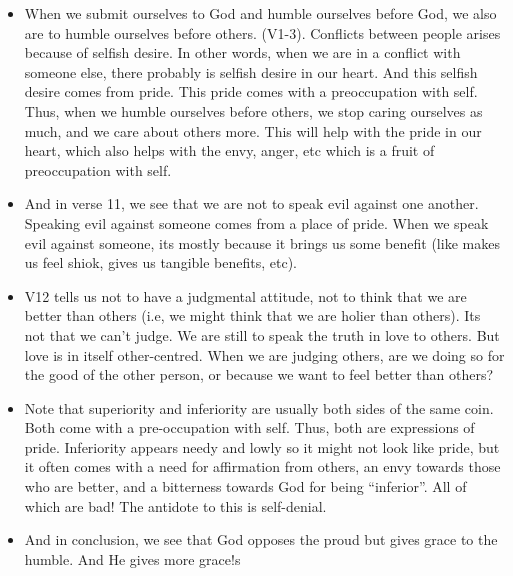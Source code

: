 \begin{itemize}
  \item When we submit ourselves to God and humble ourselves before God, we also are to humble ourselves before others. (V1-3). Conflicts between people arises because of selfish desire. In other words, when we are in a conflict with someone else, there probably is selfish desire in our heart. And this selfish desire comes from pride. This pride comes with a preoccupation with self. Thus, when we humble ourselves before others, we stop caring ourselves as much, and we care about others more. This will help with the pride in our heart, which also helps with the envy, anger, etc which is a fruit of preoccupation with self.
  \item And in verse 11, we see that we are not to speak evil against one another. Speaking evil against someone comes from a place of pride. When we speak evil against someone, its mostly because it brings us some benefit (like makes us feel shiok, gives us tangible benefits, etc). 
  \item V12 tells us not to have a judgmental attitude, not to think that we are better than others (i.e, we might think that we are holier than others). Its not that we can’t judge. We are still to speak the truth in love to others. But love is in itself other-centred. When we are judging others, are we doing so for the good of the other person, or because we want to feel better than others? 
  \item Note that superiority and inferiority are usually both sides of the same coin. Both come with a pre-occupation with self. Thus, both are expressions of pride. Inferiority appears needy and lowly so it might not look like pride, but it often comes with a need for affirmation from others, an envy towards those who are better, and a bitterness towards God for being “inferior”. All of which are bad! The antidote to this is self-denial.
  \item And in conclusion, we see that God opposes the proud but gives grace to the humble. And He gives more grace!s
\end{itemize}
